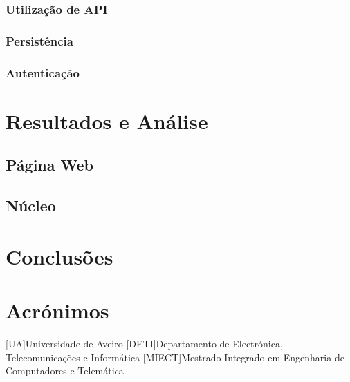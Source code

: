 \documentclass{report}
\begin{document}
\subsection{Utilização de API}

\subsection{Persistência}

\subsection{Autenticação}

\chapter{Resultados e Análise}
\label{chap.res}

\section{Página Web}

\section{Núcleo}


\chapter{Conclusões}
\label{chap.conc}



\chapter*{Acrónimos}
\begin{acronym}
 [UA]{Universidade de Aveiro}
 [DETI]{Departamento de Electrónica, Telecomunicações e Informática}
 [MIECT]{Mestrado Integrado em Engenharia de Computadores e Telemática}

\end{acronym}


%
\end{document}
